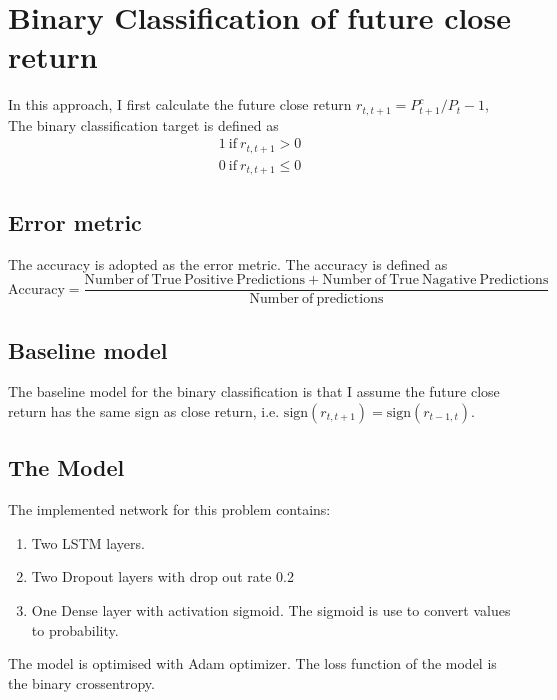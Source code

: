 \documentclass[a4paper, 11pt, usenatbib]{article}
\begin{document}
\section{Binary Classification of future close return}
In this approach, I first calculate the future close return  $r_{t, t+1} = P_{t+1}^c / P_t - 1$, The binary classification target is defined as
\begin{align*}
 1\ \mathrm{if} \ r_{t, t+1} > 0\\
 0\ \mathrm{if}\ r_{t, t+1} \le 0
\end{align*}

\subsection{Error metric}
The accuracy is adopted as the error metric. The accuracy is defined as
\begin{equation}
\mathrm{Accuracy} = \frac{\mathrm{Number\ of\ True\ Positive\ Predictions} + \mathrm{Number\ of\ True\ Nagative\ Predictions}} {\mathrm{Number\ of\ predictions}}
\end{equation}

\subsection{Baseline model}
The baseline model for the binary classification is that I assume the future close return has the same sign as close return, i.e. $\mathrm{sign}( r_{t, t+1})  = \mathrm{sign}(r_{t-1, t}) $.\\

\subsection{The Model}
The implemented network for this problem contains:
\begin{enumerate}
\item Two LSTM layers.
\item Two Dropout layers with drop out rate 0.2
\item One Dense layer with activation sigmoid. The sigmoid is use to convert values to probability.
\end{enumerate}

The model is optimised with Adam optimizer. The loss function of the model is the binary crossentropy.
\end{document}
